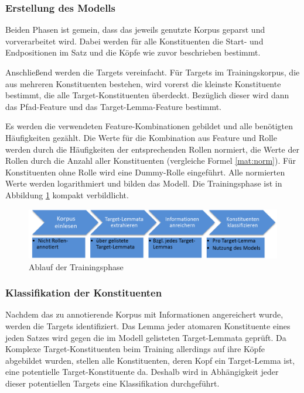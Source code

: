 \documentclass[12pt]{article}
\begin{document}
\subsubsection*{Erstellung des Modells}

Beiden Phasen ist gemein, dass das jeweils genutzte Korpus geparst und vorverarbeitet wird. Dabei werden für alle Konstituenten die Start- und Endpositionen im Satz und die Köpfe wie zuvor beschrieben bestimmt.

Anschließend werden die Targets vereinfacht. Für Targets im Trainingskorpus, die aus mehreren Konstituenten bestehen, wird vorerst die kleinste Konstituente bestimmt, die alle Target-Konstituenten überdeckt. Bezüglich dieser wird dann das Pfad-Feature und das Target-Lemma-Feature bestimmt.

Es werden die verwendeten Feature-Kombinationen gebildet und alle benötigten Häufigkeiten gezählt. Die Werte für die Kombination aus Feature und Rolle werden durch die Häufigkeiten der entsprechenden Rollen normiert, die Werte der Rollen durch die Anzahl aller Konstituenten (vergleiche Formel \eqref{mat:norm}). Für Konstituenten ohne Rolle wird eine Dummy-Rolle eingeführt. Alle normierten Werte werden logarithmiert und bilden das Modell. Die Trainingsphase ist in Abbildung \ref{training} kompakt verbildlicht. 

\begin{figure}[tb!]
		\centering
		\includegraphics[scale=0.6]{images/ablaufAnnotate.png}
		\caption{Ablauf der Trainingsphase}
		\label{training}
	\end{figure}


\subsubsection*{Klassifikation der Konstituenten}\label{subsubsec:classify}
Nachdem das zu annotierende Korpus mit Informationen angereichert wurde, werden die Targets identifiziert. Das Lemma jeder atomaren Konstituente eines jeden Satzes wird gegen die im Modell gelisteten Target-Lemmata geprüft. Da Komplexe Target-Konstituenten beim Training allerdings auf ihre Köpfe abgebildet wurden, stellen alle Konstituenten, deren Kopf ein Target-Lemma ist, eine potentielle Target-Konstituente da. Deshalb wird in Abhängigkeit jeder dieser potentiellen Targets eine Klassifikation durchgeführt.
\end{document}
